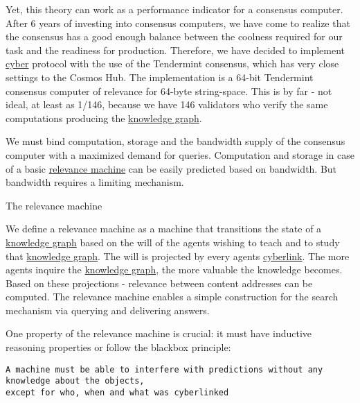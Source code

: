 \documentclass[8pt,oneside]{amsart}
\makeatletter
\newcommand{\linkred}[2]{\href{#1}{\color{red}{#2}}}
\newcommand{\linkgreen}[2]{\href{#1}{\color{green}{#2}}}
\renewcommand\subsection{\@startsection{subsection}
                                    {2}{\z@}
                                    {-3.25ex\@plus -1ex \@minus -.2ex}
                                    {0ex \@plus .2ex}
                                    {\play\Large}
                        }
\newcommand{\titleSection}[1]{\subsection{#1}}
\makeatother
\begin{document}
Yet, this theory can work as a performance indicator for a consensus computer. After 6 years of investing into consensus computers, we have come to realize that the \linkgreen{https://ipfs.io/ipfs/QmaMtD7xDgghqgjN62zWZ5TBGFiEjGQtuZBjJ9sMh816KJ}{Tendermint} consensus has a good enough balance between the coolness required for our task and the readiness for production. Therefore, we have decided to implement {\hyperref[cyber]{cyber}} protocol with the use of the Tendermint consensus, which has very close settings to the Cosmos Hub. The \linkred{https://github.com/cybercongress/go-cyber}{go-cyber} implementation is a 64-bit Tendermint consensus computer of relevance for 64-byte string-space. This is by far - not ideal, at least as 1/146, because we have 146 validators who verify the same computations producing the {\hyperref[knowledge-graph]{knowledge graph}}.

We must bind computation, storage and the bandwidth supply of the consensus computer with a maximized demand for queries. Computation and storage in case of a basic {\hyperref[relevance-machine]{relevance machine}} can be easily predicted based on bandwidth. But bandwidth requires a limiting mechanism.

\titleSection{The relevance machine}\label{relevance-machine}

We define a relevance machine as a machine that transitions the state of a {\hyperref[knowledge-graph]{knowledge graph}} based on the will of the agents wishing to teach and to study that {\hyperref[knowledge-graph]{knowledge graph}}. The will is projected by every agents {\hyperref[cyberlinks]{cyberlink}}. The more agents inquire the {\hyperref[knowledge-graph]{knowledge graph}}, the more valuable the knowledge becomes. Based on these projections - relevance between content addresses can be computed. The relevance machine enables a simple construction for the search mechanism via querying and delivering answers.

One property of the relevance machine is crucial: it must have inductive reasoning properties or follow the blackbox principle:

\begin{lstlisting}
A machine must be able to interfere with predictions without any knowledge about the objects,
except for who, when and what was cyberlinked
\end{lstlisting}
\end{document}
